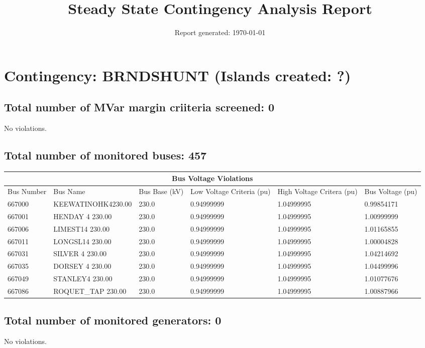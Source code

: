 \documentclass{article}%
\title{Steady State Contingency Analysis Report\vspace{-3ex}}%
\date{Report generated: \today\vspace{-2ex}}%
\begin{document}
%
\normalsize%
\maketitle%
\section*{Contingency: BRNDSHUNT (Islands created: ?)}%
\label{sec:ContingencyBRNDSHUNT(Islandscreated?)}%
\subsection*{Total number of MVar margin criiteria screened: 0}%
\label{subsec:TotalnumberofMVarmargincriiteriascreened0}%
No violations.

%
\subsection*{Total number of monitored buses: 457}%
\label{subsec:Totalnumberofmonitoredbuses457}%
\begin{tabularx}{\textwidth}{|  X |p{4cm} | X | X | X | X |}%
\hline%
\multicolumn{6}{|c|}{Bus Voltage Violations}\\%
\hline%
Bus Number&Bus Name&Bus Base (kV)&Low Voltage Criteria (pu)&High Voltage Critera (pu)&Bus Voltage (pu)\\%
\hline%
667000&KEEWATINOHK4230.00&230.0&0.94999999&1.04999995&0.99854171\\%
\hline%
\hline%
667001&HENDAY 4    230.00&230.0&0.94999999&1.04999995&1.00999999\\%
\hline%
\hline%
667006&LIMEST14    230.00&230.0&0.94999999&1.04999995&1.01165855\\%
\hline%
\hline%
667011&LONGSL14    230.00&230.0&0.94999999&1.04999995&1.00004828\\%
\hline%
\hline%
667031&SILVER 4    230.00&230.0&0.94999999&1.04999995&1.04214692\\%
\hline%
\hline%
667035&DORSEY 4    230.00&230.0&0.94999999&1.04999995&1.04499996\\%
\hline%
\hline%
667049&STANLEY4    230.00&230.0&0.94999999&1.04999995&1.01077676\\%
\hline%
\hline%
667086&ROQUET\_TAP  230.00&230.0&0.94999999&1.04999995&1.00887966\\%
\hline%
\end{tabularx}

%
\subsection*{Total number of monitored generators: 0}%
\label{subsec:Totalnumberofmonitoredgenerators0}%
No violations.
\end{document}
